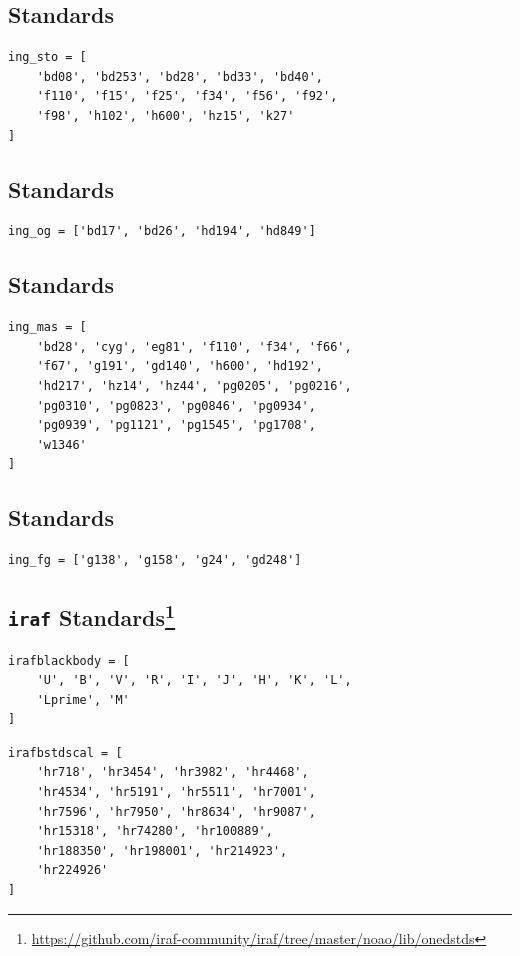 \documentclass[fleqn,usenatbib]{mnras}
\begin{document}
\subsection*{\citet{1977ApJ...218..767S} Standards}

\begin{verbatim}
ing_sto = [
    'bd08', 'bd253', 'bd28', 'bd33', 'bd40',
    'f110', 'f15', 'f25', 'f34', 'f56', 'f92',
    'f98', 'h102', 'h600', 'hz15', 'k27'
]
\end{verbatim}


\subsection*{\citet{1965ApJ...141...83E} Standards}
\begin{verbatim}
ing_og = ['bd17', 'bd26', 'hd194', 'hd849']
\end{verbatim}

\subsection*{\citet{1988ApJ...328..315M} Standards}
\begin{verbatim}
ing_mas = [
    'bd28', 'cyg', 'eg81', 'f110', 'f34', 'f66',
    'f67', 'g191', 'gd140', 'h600', 'hd192',
    'hd217', 'hz14', 'hz44', 'pg0205', 'pg0216',
    'pg0310', 'pg0823', 'pg0846', 'pg0934',
    'pg0939', 'pg1121', 'pg1545', 'pg1708',
    'w1346'
]
\end{verbatim}

\subsection*{\citet{1984PASP...96..530F} Standards}
\begin{verbatim}
ing_fg = ['g138', 'g158', 'g24', 'gd248']
\end{verbatim}

\subsection{\texttt{iraf} Standards\footnote{\url{https://github.com/iraf-community/iraf/tree/master/noao/lib/onedstds}}}
\begin{verbatim}
irafblackbody = [
    'U', 'B', 'V', 'R', 'I', 'J', 'H', 'K', 'L',
    'Lprime', 'M'
]
\end{verbatim}

\begin{verbatim}
irafbstdscal = [
    'hr718', 'hr3454', 'hr3982', 'hr4468',
    'hr4534', 'hr5191', 'hr5511', 'hr7001',
    'hr7596', 'hr7950', 'hr8634', 'hr9087',
    'hr15318', 'hr74280', 'hr100889',
    'hr188350', 'hr198001', 'hr214923',
    'hr224926'
]
\end{verbatim}
\end{document}

